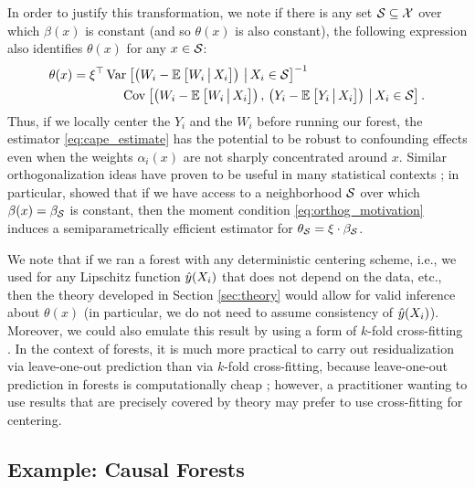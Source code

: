 \documentclass[aos]{imsart}
\theoremstyle{plain}
\theoremstyle{definition}
\theoremstyle{remark}
\begin{document}
\begin{CJK}{UTF8}{gbsn}
In order to justify this transformation, we note if there is any set $\mathcal{S} \subseteq \mathcal{X}$
over which $\beta(x)$ is constant (and so $\theta(x)$ is also constant), the following expression
also identifies $\theta(x)$ for any $x \in \mathcal{S}$:
\begin{equation}
\label{eq:orthog_motivation}
\begin{split}
\theta(x) = \xi^\top &\Var{\p{W_i - \EE{W_i \cond X_i}} \cond X_i \in \set}^{-1} \\
& \ \ \ \ \Cov{\p{W_i - \EE{W_i \cond X_i}}, \, \p{Y_i - \EE{Y_i \cond X_i}} \cond X_i \in \set}.
\end{split}
\end{equation}
Thus, if we locally center the $Y_i$ and the $W_i$ before running our forest, the estimator
\eqref{eq:cape_estimate} has the potential to be robust to confounding effects
even when the weights $\alpha_i(x)$ are not sharply concentrated around $x$.
Similar orthogonalization ideas have proven to be useful in many statistical contexts
\citep[e.g.,][]{chernozhukov2016double,newey1994asymptotic,neyman1979c};
in particular, \citet{robinson1988root} showed that if we have access to a neighborhood $\mathcal{S}$
over which $\beta(x) = \beta_{\mathcal{S}}$ is constant, then the moment condition \eqref{eq:orthog_motivation}
induces a semiparametrically efficient estimator for $\theta_{\mathcal{S}} = \xi \cdot \beta_{\mathcal{S}}$.

We note that if we ran a forest with any deterministic
centering scheme, i.e., we used  for any Lipschitz function $\hat{y}(X_i)$
that does not depend on the data, etc., then the theory developed in Section \ref{sec:theory}
would allow for valid inference about $\theta(x)$ (in particular, we do not need to
assume consistency of $\hat{y}(X_i)$). Moreover, we could also emulate this result by using a form of $k$-fold
cross-fitting \citep{chernozhukov2016double,schick1986asymptotically}.
In the context of forests, it is much more practical to carry out residualization
via leave-one-out prediction than via $k$-fold cross-fitting, because
leave-one-out prediction in forests is computationally cheap \citep{breiman2001random};
however, a practitioner wanting to use results that are precisely covered by theory may prefer
to use cross-fitting for centering.

\subsection{Example: Causal Forests}
\label{sec:cf}


\end{CJK}
\end{document}
